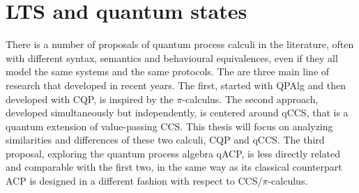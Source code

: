 
\section{LTS and quantum states} 

There is a number of proposals of quantum process calculi in the literature, often with different syntax, semantics and behavioural equivalences, even if they all model the same systems and the same protocols. 
The are three main line of research that developed in recent years. The first, started with QPAlg and then developed with CQP, is inspired by the $\pi$-calculus. 
The second approach, developed simultaneously but independently, is centered around qCCS, that is a quantum extension of value-passing CCS. 
This thesis will focus on analyzing similarities and differences of these two calculi, CQP and qCCS. 
The third proposal, exploring the quantum process algebra qACP, is less directly related and comparable with the first two, in the same way as its classical counterpart ACP is designed in a different fashion with respect to CCS/$\pi$-calculus.


